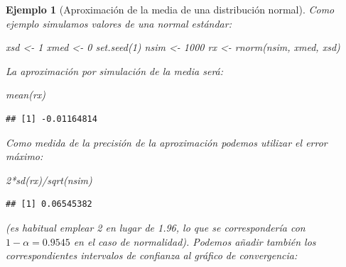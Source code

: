 \documentclass[
]{book}
\newenvironment{Shaded}{\begin{snugshade}}{\end{snugshade}}
\newcommand{\DecValTok}[1]{\textcolor[rgb]{0.00,0.00,0.81}{#1}}
\newcommand{\FunctionTok}[1]{\textcolor[rgb]{0.00,0.00,0.00}{#1}}
\newcommand{\NormalTok}[1]{#1}
\newcommand{\OtherTok}[1]{\textcolor[rgb]{0.56,0.35,0.01}{#1}}
\newcommand{\SpecialCharTok}[1]{\textcolor[rgb]{0.00,0.00,0.00}{#1}}
\theoremstyle{break}
\newtheorem{example}{Ejemplo}[chapter]
\theoremstyle{nonumberplain}
\begin{document}
\begin{example}[Aproximación de la media de una distribución normal]

Como ejemplo simulamos valores de una normal estándar:

\begin{Shaded}
\begin{Highlighting}[]
\NormalTok{xsd }\OtherTok{\textless{}{-}} \DecValTok{1}
\NormalTok{xmed }\OtherTok{\textless{}{-}} \DecValTok{0}
\FunctionTok{set.seed}\NormalTok{(}\DecValTok{1}\NormalTok{)}
\NormalTok{nsim }\OtherTok{\textless{}{-}} \DecValTok{1000}
\NormalTok{rx }\OtherTok{\textless{}{-}} \FunctionTok{rnorm}\NormalTok{(nsim, xmed, xsd)}
\end{Highlighting}
\end{Shaded}

La aproximación por simulación de la media será:

\begin{Shaded}
\begin{Highlighting}[]
\FunctionTok{mean}\NormalTok{(rx)}
\end{Highlighting}
\end{Shaded}

\begin{verbatim}
## [1] -0.01164814
\end{verbatim}

Como medida de la precisión de la aproximación podemos utilizar el error máximo:

\begin{Shaded}
\begin{Highlighting}[]
\DecValTok{2}\SpecialCharTok{*}\FunctionTok{sd}\NormalTok{(rx)}\SpecialCharTok{/}\FunctionTok{sqrt}\NormalTok{(nsim)}
\end{Highlighting}
\end{Shaded}

\begin{verbatim}
## [1] 0.06545382
\end{verbatim}

(es habitual emplear 2 en lugar de 1.96,
lo que se correspondería con \(1 - \alpha = 0.9545\) en el caso de normalidad).
Podemos añadir también los correspondientes intervalos de confianza al gráfico de convergencia:


\end{example}
\end{document}
